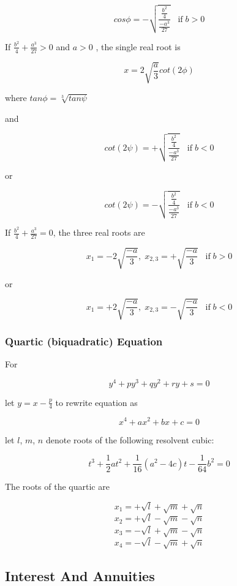 \documentclass[
]{book}
\begin{document}
\[cos\phi = - \sqrt{\frac{ \frac{b^2}{4} }{ \frac{-a^3}{27} }} \;\;\;\text{if}\; b > 0\]

If \(\frac{b^2}{4} + \frac{a^3}{27} > 0\) and \(a > 0\) , the single real root is

\[x = 2 \sqrt{\frac{a}{3}} cot \left( 2\phi \right)\]

where \(tan\phi = \sqrt[3]{tan\psi}\)

and

\[ cot \left( 2\psi \right) = + \sqrt{\frac{ \frac{b^2}{4} }{ \frac{-a^3}{27} }} \;\;\;\text{if}\; b < 0\]

or

\[ cot \left( 2\psi \right) = - \sqrt{\frac{ \frac{b^2}{4} }{ \frac{-a^3}{27} }} \;\;\;\text{if}\; b < 0\]

If \(\frac{b^2}{4} + \frac{a^3}{27} = 0\), the three real roots are

\[ x_{1} = -2 \sqrt{\frac{-a}{3}}, \; x_{2,3} = +\sqrt{\frac{-a}{3}} \;\;\; \text{if} \; b > 0 \]

or

\[ x_{1} = +2 \sqrt{\frac{-a}{3}}, \; x_{2,3} = -\sqrt{\frac{-a}{3}} \;\;\; \text{if} \; b < 0 \]

\hypertarget{quartic-biquadratic-equation}{%
\subsubsection*{Quartic (biquadratic) Equation}\label{quartic-biquadratic-equation}}

For

\[y^4 + py^3 + qy^2 + ry + s = 0\]

let \(y = x - \frac{p}{4}\) to rewrite equation as

\[x^4 + ax^2 + bx + c = 0\]

let \(l\), \(m\), \(n\) denote roots of the following resolvent cubic:

\[ t^3 + \frac{1}{2} at^2 +  \frac{1}{16} \left( a^2 - 4c \right) t -  \frac{1}{64}b^2 = 0 \]

The roots of the quartic are

\[ x_{1} = + \sqrt{l} + \sqrt{m} + \sqrt{n} \]
\[ x_{2} = + \sqrt{l} - \sqrt{m} - \sqrt{n} \]
\[ x_{3} = - \sqrt{l} + \sqrt{m} - \sqrt{n} \]
\[ x_{4} = - \sqrt{l} - \sqrt{m} + \sqrt{n} \]

\hypertarget{interest-and-annuities}{%
\subsection{Interest And Annuities}\label{interest-and-annuities}}
\end{document}
